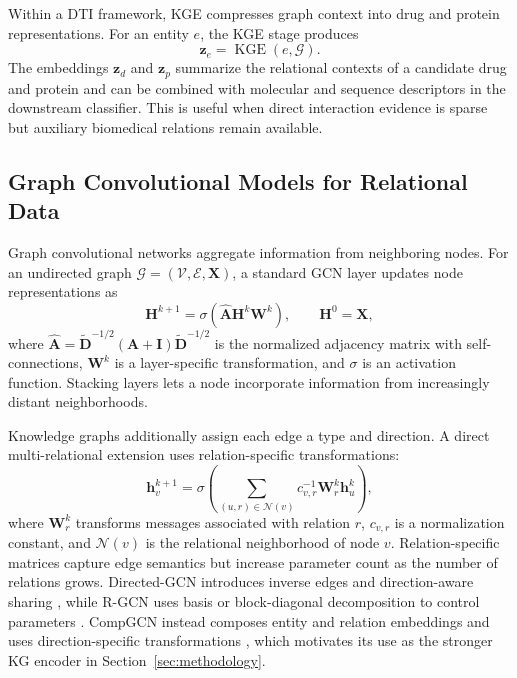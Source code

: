 Within a DTI framework, KGE compresses graph context into drug and protein representations. For an entity $e$, the KGE stage produces
\begin{equation}
    \mathbf{z}_{e}
    =
    \operatorname{KGE}(e,\mathcal{G}).
\end{equation}
The embeddings $\mathbf{z}_{d}$ and $\mathbf{z}_{p}$ summarize the relational contexts of a candidate drug and protein and can be combined with molecular and sequence descriptors in the downstream classifier. This is useful when direct interaction evidence is sparse but auxiliary biomedical relations remain available.

\subsection{Graph Convolutional Models for Relational Data}

Graph convolutional networks aggregate information from neighboring nodes. For an undirected graph $\mathcal{G}=(\mathcal{V},\mathcal{E},\mathbf{X})$, a standard GCN layer updates node representations as \cite{kipf2017semi}
\begin{equation}
    \mathbf{H}^{k+1}
    =
    \sigma
    \left(
        \widehat{\mathbf{A}}\mathbf{H}^{k}\mathbf{W}^{k}
    \right),
    \qquad
    \mathbf{H}^{0}=\mathbf{X},
    \label{eq:background_gcn_update}
\end{equation}
where $\widehat{\mathbf{A}}=\widetilde{\mathbf{D}}^{-1/2}(\mathbf{A}+\mathbf{I})\widetilde{\mathbf{D}}^{-1/2}$ is the normalized adjacency matrix with self-connections, $\mathbf{W}^{k}$ is a layer-specific transformation, and $\sigma$ is an activation function. Stacking layers lets a node incorporate information from increasingly distant neighborhoods.

Knowledge graphs additionally assign each edge a type and direction. A direct multi-relational extension uses relation-specific transformations:
\begin{equation}
    \mathbf{h}_{v}^{k+1}
    =
    \sigma
    \left(
        \sum_{(u,r)\in\mathcal{N}(v)}
        c_{v,r}^{-1}\mathbf{W}_{r}^{k}\mathbf{h}_{u}^{k}
    \right),
    \label{eq:background_relational_gcn_update}
\end{equation}
where $\mathbf{W}_{r}^{k}$ transforms messages associated with relation $r$, $c_{v,r}$ is a normalization constant, and $\mathcal{N}(v)$ is the relational neighborhood of node $v$. Relation-specific matrices capture edge semantics but increase parameter count as the number of relations grows. Directed-GCN introduces inverse edges and direction-aware sharing \cite{MarcheggianiT17}, while R-GCN uses basis or block-diagonal decomposition to control parameters \cite{schlichtkrull2018modeling}. CompGCN instead composes entity and relation embeddings and uses direction-specific transformations \cite{VashishthSNT20}, which motivates its use as the stronger KG encoder in Section~\ref{sec:methodology}.

